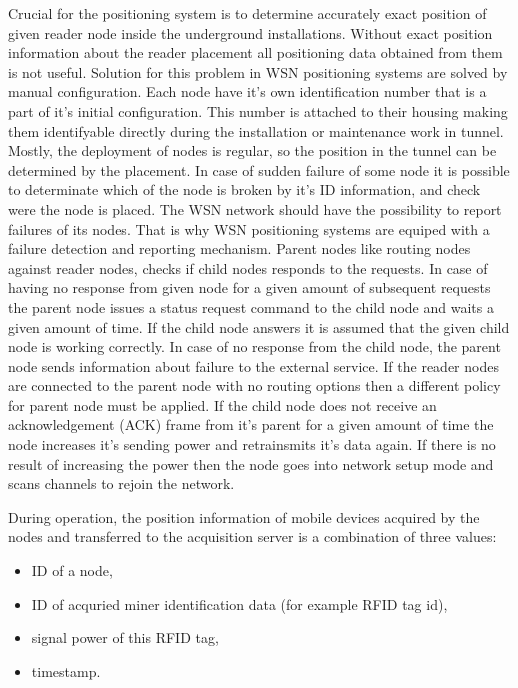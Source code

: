 \documentclass[../main.tex]{subfiles}
\begin{document}
Crucial for the positioning system is to determine accurately exact position of given reader node inside the underground installations. Without exact position information about the reader placement all positioning data obtained from them is not useful. Solution for this problem in WSN positioning systems are solved by manual configuration. Each node have it's own identification number that is a part of it's initial configuration. This number is attached to their housing making them identifyable directly during the installation or maintenance work in tunnel. Mostly, the deployment of nodes is regular, so the position in the tunnel can be determined by the placement. In case of sudden failure of some node it is possible to determinate which of the node is broken by it's ID information, and check were the node is placed. The WSN network should have the possibility to report failures of its nodes. That is why WSN positioning systems are equiped with a failure detection and reporting mechanism. Parent nodes like routing nodes against reader nodes, checks if child nodes responds to the requests. In case of having no response from given node for a given amount of subsequent requests the parent node issues a status request command to the child node and waits a given amount of time. If the child node answers it is assumed that the given child node is working correctly. In case of no response from the child node, the parent node sends information about failure to the external service. If the reader nodes are connected to the parent node with no routing options then a different policy for parent node must be applied. If the child node does not receive an acknowledgement (ACK) frame from it's parent for a given amount of time the node increases it's sending power and retrainsmits it's data again. If there is no result of increasing the power then the node goes into network setup mode and scans channels to rejoin the network.

During operation, the position information of mobile devices acquired by the nodes and transferred to the acquisition server is a combination of three values:
\begin{itemize}
	\item ID of a node,
	\item ID of acquried miner identification data (for example RFID tag id),
	\item signal power of this RFID tag,
	\item timestamp.
\end{itemize}
\end{document}
